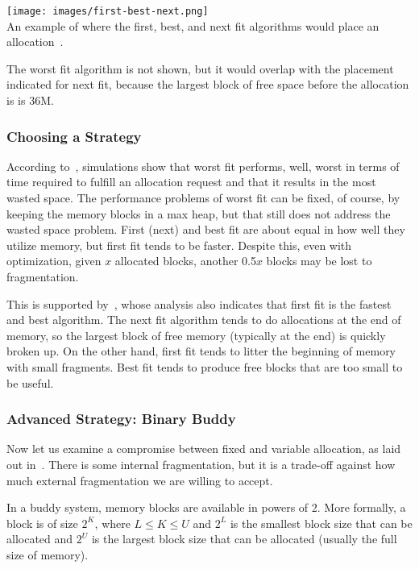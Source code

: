 \begin{center}
\texttt{[image: images/first-best-next.png]}\\
An example of where the first, best, and next fit algorithms would place an allocation~\cite{osi}.
\end{center}

The worst fit algorithm is not shown, but it would overlap with the placement indicated for next fit, because the largest block of free space before the allocation is is 36M.

\subsubsection*{Choosing a Strategy}

According to~\cite{osc}, simulations show that worst fit performs, well, worst in terms of time required to fulfill an allocation request and that it results in the most wasted space. The performance problems of worst fit can be fixed, of course, by keeping the memory blocks in a max heap, but that still does not address the wasted space problem. First (next) and best fit are about equal in how well they utilize memory, but first fit tends to be faster. Despite this, even with optimization, given $x$ allocated blocks, another 0.5$x$ blocks may be lost to fragmentation.

This is supported by~\cite{osi}, whose analysis also indicates that first fit is the fastest and best algorithm. The next fit algorithm tends to do allocations at the end of memory, so the largest block of free memory (typically at the end) is quickly broken up. On the other hand, first fit tends to litter the beginning of memory with small fragments. Best fit tends to produce free blocks that are too small to be useful. 

\subsubsection*{Advanced Strategy: Binary Buddy}
Now let us examine a compromise between fixed and variable allocation, as laid out in~\cite{osi}. There is some internal fragmentation, but it is a trade-off against how much external fragmentation we are willing to accept.

In a buddy system, memory blocks are available in powers of 2. More formally, a block is of size $2^{K}$, where $L \leq K \leq U$ and $2^{L}$ is the smallest block size that can be allocated and $2^{U}$ is the largest block size that can be allocated (usually the full size of memory). 

